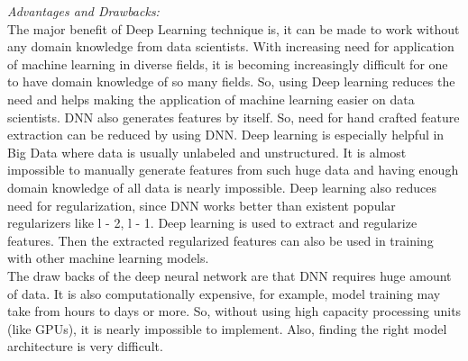 \documentclass[conference]{IEEEtran}
\begin{document}
\emph{Advantages and Drawbacks:}\\
The major benefit of Deep Learning technique is, it can be made to work without any domain knowledge from data scientists. With increasing need for application of machine learning in diverse fields, it is becoming increasingly difficult for one to have domain knowledge of so many fields. So, using Deep learning reduces the need and helps making the application of machine learning easier on data scientists. DNN also generates features by itself. So, need for hand crafted feature extraction can be reduced by using DNN. Deep learning is especially helpful in Big Data where data is usually unlabeled and unstructured. It is almost impossible to manually generate features from such huge data and having enough domain knowledge of all data is nearly impossible. Deep learning also reduces need for regularization, since DNN works better than existent popular regularizers like l - 2, l - 1. Deep learning is used to extract and regularize features. Then the extracted regularized features can also be used in training with other machine learning models.\\
The draw backs of the deep neural network are that DNN requires huge amount of data. It is also computationally expensive, for example, model training may take from hours to days or more. So, without using high capacity processing units (like GPUs), it is nearly impossible to implement. Also, finding the right model architecture is very difficult.
\end{document}
